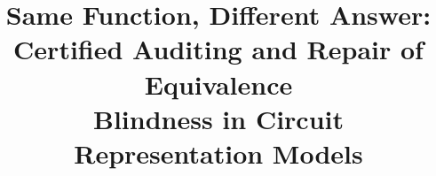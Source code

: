 \documentclass[conference]{IEEEtran}
\begin{document}
\title{Same Function, Different Answer:\\
Certified Auditing and Repair of Equivalence\\
Blindness in Circuit Representation Models}
\author{
}
\maketitle

\begin{abstract}

\end{abstract}



\clearpage
{\footnotesize

}
\end{document}
